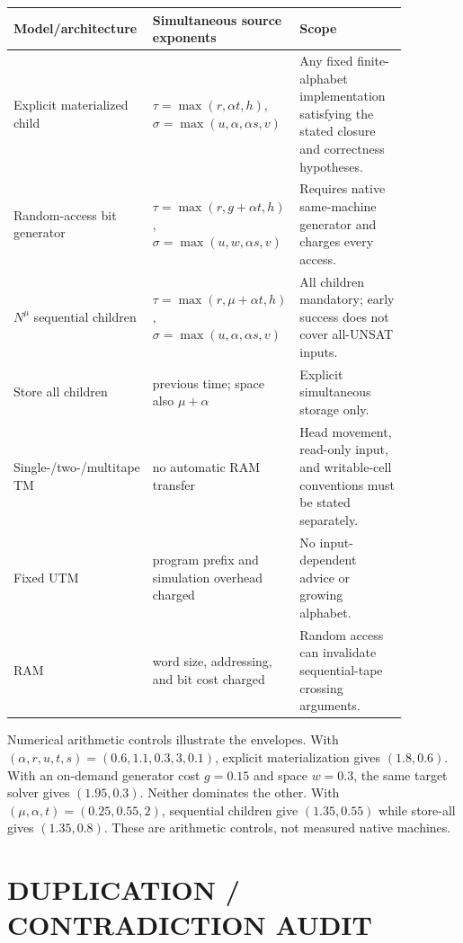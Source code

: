 \documentclass[11pt]{article}
\begin{document}
\begin{center}
\begin{tabular}{p{0.22\linewidth}p{0.31\linewidth}p{0.34\linewidth}}
\toprule
Model/architecture & Simultaneous source exponents & Scope\\
\midrule
Explicit materialized child &
$\tau=\max(r,\alpha t,h)$,
$\sigma=\max(u,\alpha,\alpha s,v)$ &
Any fixed finite-alphabet implementation satisfying the stated closure and correctness hypotheses.\\
Random-access bit generator &
$\tau=\max(r,g+\alpha t,h)$,
$\sigma=\max(u,w,\alpha s,v)$ &
Requires native same-machine generator and charges every access.\\
$N^\mu$ sequential children &
$\tau=\max(r,\mu+\alpha t,h)$,
$\sigma=\max(u,\alpha,\alpha s,v)$ &
All children mandatory; early success does not cover all-UNSAT inputs.\\
Store all children & previous time; space also $\mu+\alpha$ &
Explicit simultaneous storage only.\\
Single-/two-/multitape TM & no automatic RAM transfer &
Head movement, read-only input, and writable-cell conventions must be stated separately.\\
Fixed UTM & program prefix and simulation overhead charged &
No input-dependent advice or growing alphabet.\\
RAM & word size, addressing, and bit cost charged &
Random access can invalidate sequential-tape crossing arguments.\\
\bottomrule
\end{tabular}
\end{center}

Numerical arithmetic controls illustrate the envelopes.  With
$(\alpha,r,u,t,s)=(0.6,1.1,0.3,3,0.1)$, explicit materialization gives $(1.8,0.6)$.
With an on-demand generator cost $g=0.15$ and space $w=0.3$, the same target solver gives
$(1.95,0.3)$.  Neither dominates the other.  With $(\mu,\alpha,t)=(0.25,0.55,2)$, sequential children
give $(1.35,0.55)$ while store-all gives $(1.35,0.8)$.  These are arithmetic controls, not measured
native machines.

\section{DUPLICATION / CONTRADICTION AUDIT}
\end{document}
